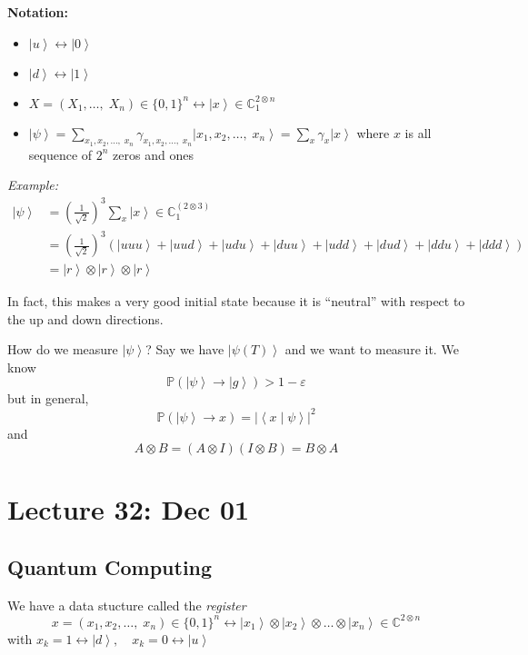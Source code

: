 \documentclass[12pt]{article}
\renewcommand{\P}{\mathbb{P}}
\newcommand{\brak}[1]{\left\langle #1 \right\rangle}
\newcommand{\C}{\mathbb{C}}
\newcommand{\ket}[1]{\left\vert #1 \right\rangle}
\newcommand{\abs}[1]{\left\vert #1 \right\vert}
\begin{document}
        \textbf{Notation:}
            \begin{itemize}
                \item $\ket{u} \leftrightarrow \ket{0}$
                \item $\ket{d} \leftrightarrow \ket{1}$
                \item $X = (X_1, \dots,\; X_n) \in \{0, 1\}^n \leftrightarrow \ket{x} \in \C_1^{2\otimes n}$ 
                \item $\ket{\psi} = \sum_{x_1, x_2, \dots,\; x_n} \gamma_{x_1, x_2, \dots,\; x_n}\ket{x_1, x_2, \dots,\; x_n} = \sum_x \gamma_x \ket{x}$ where $x$ is all sequence of $2^n$ zeros and ones 
            \end{itemize}

        \emph{Example:} 
        \begin{align*}
            \ket{\psi} &= (\frac{1}{\sqrt 2})^3 \sum_x \ket{x} \in \C_1^{(2 \otimes 3)}\\ 
                &= (\frac{1}{\sqrt{2}})^3 (\ket{uuu} + \ket{uud} + \ket{udu} + \ket{duu} + \ket{udd}  + \ket{dud} + \ket{ddu} + \ket{ddd})\\
                &= \ket{r} \otimes \ket{r} \otimes \ket{r}
        \end{align*} 

        In fact, this makes a very good initial state because it is ``neutral'' with respect to the up and down directions. 

        How do we measure $\ket{\psi}$? Say we have $\ket{\psi(T)}$ and we want to measure it. We know 
        \[\P(\ket{\psi} \to \ket{g}) > 1 - \varepsilon\]
        but in general, 
        \[\P(\ket{\psi} \to x) = \abs{\brak{x \; | \; \psi}}^2\]
        and 
        \[A \otimes B = (A \otimes I)(I \otimes B) = B \otimes A\]

\section*{Lecture 32: Dec 01}
    \subsection*{Quantum Computing}
        We have a data stucture called the \emph{register} 
        \[x = (x_1, x_2, \dots,\; x_n) \in \{0, 1\}^n \leftrightarrow \ket{x_1} \otimes \ket{x_2} \otimes \dots \otimes \ket{x_n} \in \C^{2 \otimes n}\]
        with $x_k = 1 \leftrightarrow \ket{d}, \quad x_k = 0 \leftrightarrow \ket{u}$
\end{document}
